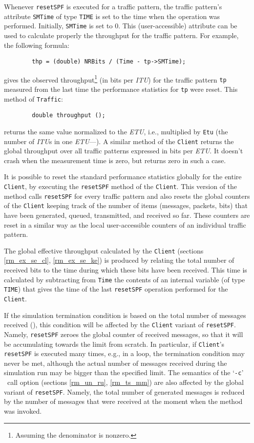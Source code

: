 Whenever {\tt resetSPF} is executed for a traffic pattern, the
traffic pattern's attribute {\tt SMTime} of type {\tt TIME} is set to
the time when the operation was performed.
Initially, {\tt SMTime} is set to 0.
This (user-accessible) attribute can be used to calculate properly
the throughput for the traffic pattern.
For example, the following formula:
\begin{verbatim}
        thp = (double) NRBits / (Time - tp->SMTime);
\end{verbatim}
gives the observed
throughput\footnote{Assuming the denominator is nonzero.}
(in bits per {\em ITU\/})
for the traffic pattern {\tt tp} measured
from the last time the performance statistics for {\tt tp} were
reset.
This method of {\tt Traffic}:
\begin{verbatim}
        double throughput ();
\end{verbatim}
\noindent
returns the same value normalized to the {\em ETU}, i.e., multiplied by
{\tt Etu} (the number of {\em ITU\/}s in one {\em ETU\/}---).
A similar method of the {\tt Client} returns the global throughput over all
traffic patterns expressed in bits per {\em ETU}.
It doesn't crash when the measurement time is zero, but returns zero in such
a case.

It is possible to reset the standard performance statistics globally
for the entire {\tt Client}, by executing the {\tt resetSPF} method
of the {\tt Client}.
This version of the method calls {\tt resetSPF} for every traffic
pattern and also resets the global counters of the {\tt Client}
keeping track of the number of items (messages, packets, bits) that
have been generated, queued, transmitted, and received so far.
These counters are reset in a similar way as the local user-accessible
counters of an individual traffic pattern.

The global effective throughput calculated by the {\tt Client}
(sections \ref{rm_ex_se_cl}, \ref{rm_ex_se_ke}) is produced by
relating the total number of received bits to the time during
which these bits have been received.
This time is calculated by subtracting from {\tt Time} the
contents of an internal
variable (of type {\tt TIME}) that gives the time of the last
{\tt resetSPF} operation performed for the {\tt Client}.

If the simulation termination condition is based on the total
number of messages received (), this condition
will be affected by the {\tt Client} variant of {\tt resetSPF}.
Namely, {\tt resetSPF} zeroes the global counter of received messages,
so that it will be accumulating towards the limit from scratch.
In particular, if {\tt Client}'s {\tt resetSPF} is executed many
times, e.g., in a loop, the termination condition may never be met,
although the actual number of messages received during the simulation
run may be bigger than the specified limit.
The semantics of the `{\tt -c}' \smurph\ call option (sections \ref{rm_un_ru},
\ref{rm_ts_mm}) are also affected by the global variant of {\tt resetSPF}.
Namely, the total number of generated messages is reduced by the
number of messages that were received at the moment when the method
was invoked.

